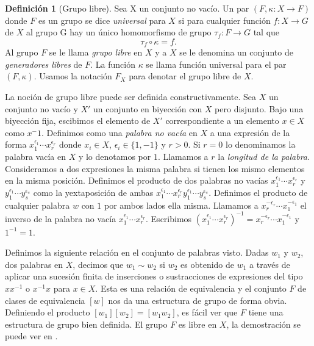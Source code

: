 \documentclass[12pt]{book}
\theoremstyle{definition}
\newtheorem{defi}{Definición}[section]
\begin{document}
\begin{defi}[Grupo libre]
Sea X un conjunto no vacío. Un par $(F,\kappa:X\rightarrow F)$ donde $F$ es un grupo se dice \textit{universal} para $X$ si para cualquier función $f:X\rightarrow G$ de $X$ al grupo G hay un único homomorfismo de grupo $\tau_f:F\rightarrow G$ tal que
$$\tau_f\circ\kappa = f.$$
Al grupo $F$ se le llama \textit{grupo libre} en $X$ y a $X$ se le denomina un conjunto de \textit{generadores libres} de $F$. La función $\kappa$ se llama función universal para el par $(F,\kappa)$. Usamos la notación $F_X$ para denotar el grupo libre de $X$.



La noción de grupo libre puede ser definida constructivamente. Sea $X$ un conjunto no vacío y $X'$ un conjunto en biyección con $X$ pero disjunto. Bajo una biyección fija, escibimos el elemento de $X'$ correspondiente a un elemento $x\in X$ como $x^-1$. Definimos como una \textit{palabra no vacía} en $X$ a una expresión de la forma $x_1^{\epsilon_1}\cdots x_r^{\epsilon_r}$ donde $x_i\in X$, $\epsilon_i\in\{1,-1\}$ y $r>0$. Si $r = 0$ lo denominamos la palabra vacía en $X$ y lo denotamos por $1$. Llamamos a $r$ la \textit{longitud de la palabra}. Consideramos a dos expresiones la misma palabra si tienen los mismo elementos en la misma posición. Definimos el producto de dos palabras no vacías $x_1^{\epsilon_1}\cdots x_r^{\epsilon_r}$ y $y_1^{\epsilon_1}\cdots y_s^{\epsilon_s}$ como la yextaposición de ambas $x_1^{\epsilon_1}\cdots x_r^{\epsilon_r}y_1^{\epsilon_1}\cdots y_s^{\epsilon_s}$. Definimos el producto de cualquier palabra $w$ con $1$ por ambos lados ella misma. Llamamos a $x_r^{-\epsilon_r}\cdots x_1^{-\epsilon_1}$ el inverso de la palabra no vacía $x_1^{\epsilon_1}\cdots x_r^{\epsilon_r}$. Escribimos $(x_1^{\epsilon_1}\cdots x_r^{\epsilon_r})^{-1}=x_r^{-\epsilon_r}\cdots x_1^{-\epsilon_1}$ y $1^{-1}=1$. 

Definimos la siguiente relación en el conjunto de palabras visto. Dadas $w_1$ y $w_2$, dos palabras en $X$, decimos que $w_1\sim w_2$ si $w_2$ es obtenido de $w_1$ a través de aplicar una sucesión finita de inserciones o sustracciones de expresiones del tipo $xx^{-1}$ o $x^{-1}x$ para $x\in X$. Esta es una relación de equivalencia y el conjunto $F$ de clases de equivalencia $[w]$ nos da una estructura de grupo de forma obvia. Definiendo el producto $[w_1][w_2]=[w_1w_2]$, es fácil ver que $F$ tiene una estructura de grupo bien definida. El grupo $F$ es libre en $X$, la demostración se puede ver en \cite{free}.




\end{defi}
\end{document}
